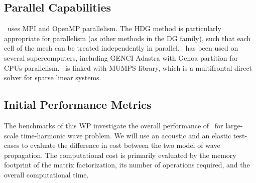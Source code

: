 \subsection{Parallel Capabilities}
\label{sec:WP1:Hawen:performances}

\hawen~uses MPI and OpenMP parallelism. The HDG method is particularly 
appropriate for parallelism (as other methods in the DG family), such 
that each cell of the mesh can be treated independently in parallel. 
\hawen~has been used on several supercomputers, including GENCI Adastra
with Genoa partition for CPUs parallelism.
\hawen~is linked with MUMPS library, which is a multifrontal direct solver 
for sparse linear systems. 



\subsection{Initial Performance Metrics}
\label{sec:WP1:Hawen:metrics}

The benchmarks of this WP investigate the overall performance
of \hawen~for large-scale time-harmonic wave problem. We will
use an acoustic and an elastic test-cases to evaluate the 
difference in cost between the two model of wave propagation.
The computational cost is primarily evaluated by the memory footprint 
of the matrix factorization, its number of operations required,
and the overall computational time.

